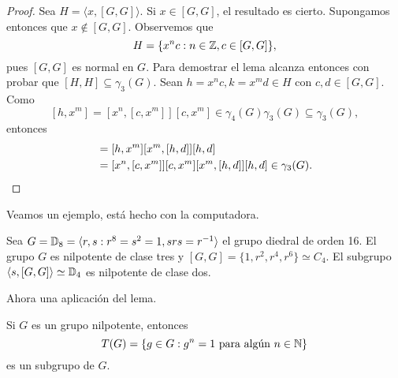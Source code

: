 \begin{proof}
	Sea $H=\langle x,[G,G]\rangle$.  Si $x\in [G,G]$, el resultado es cierto.
	Supongamos entonces que $x\not\in [G,G]$. Observemos que 
	\[
		H=\{x^nc:n\in\mathbb{Z},c\in [G,G]\},
	\]
	pues $[G,G]$ es normal en $G$. Para demostrar el lema  
	alcanza entonces con probar que $[H,H]\subseteq\gamma_3(G)$. Sean $h=x^nc,k=x^md\in H$
	con $c,d\in [G,G]$. 
	Como 
	\[
	[h,x^m]=[x^n,[c,x^m]][c,x^m]\in\gamma_4(G)\gamma_3(G)\subseteq\gamma_3(G),
	\]
	entonces 
	\begin{align*}
		[h,k]&=[h,x^m][x^m,[h,d]][h,d]\\
			&=[x^n,[c,x^m]][c,x^m][x^m,[h,d]][h,d]\in\gamma_3(G).\qedhere
	\end{align*}
\end{proof}

Veamos un ejemplo, está hecho con la computadora. 

\begin{example}
	Sea $G=\mathbb{D}_{8}=\langle r,s:r^{8}=s^2=1,srs=r^{-1}\rangle$ el grupo diedral
	de orden 16. El grupo $G$ es nilpotente de clase tres
	y $[G,G]=\{1,r^2,r^4,r^6\}\simeq C_4$. El subgrupo $\langle
	s,[G,G]\rangle\simeq\mathbb{D}_4$ es nilpotente de clase dos.
\end{example}

Ahora una aplicación del lema. 

\begin{theorem}
	\label{theorem:T(nilpotent)}
	Si $G$ es un grupo nilpotente, entonces
	\[
	T(G)=\{g\in G:g^n=1\text{ para algún $n\in\mathbb{N}$}\}
	\]
	es un subgrupo de $G$. 
\end{theorem}

